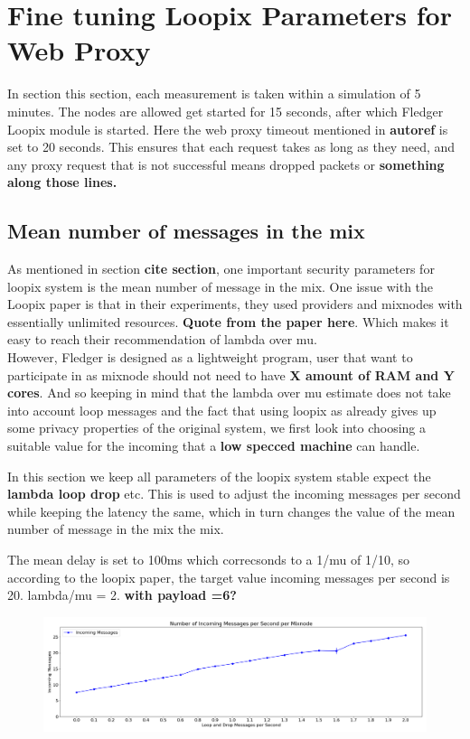 \documentclass[a4paper,11pt,oneside]{report}
\begin{document}
\section{Fine tuning Loopix Parameters for Web Proxy}
\label{sec:finetune}
In section this section, each measurement is taken within a simulation of 5 minutes. The nodes are allowed get started for 15 seconds, after which Fledger Loopix module is started. Here the web proxy timeout mentioned in \textbf{autoref} is set to 20 seconds. This ensures that each request takes as long as they need, and any proxy request that is not successful means dropped packets or \textbf{something along those lines.}
\subsection{Mean number of messages in the mix}
As mentioned in section \textbf{cite section}, one important security parameters for loopix system is the mean number of message in the mix. One issue with the Loopix paper is that in their experiments, they used providers and mixnodes with essentially unlimited resources. \textbf{Quote from the paper here}. Which makes it easy to reach their recommendation of lambda over mu. \\
However, Fledger is designed as a lightweight program, user that want to participate in as mixnode should not need to have \textbf{X amount of RAM and Y cores}. And so keeping in mind that the lambda over mu estimate does not take into account loop messages and the fact that using loopix as already gives up some privacy properties of the original system, we first look into choosing a suitable value for the incoming that a \textbf{low specced machine} can handle.

In this section we keep all parameters of the loopix system stable expect the \textbf{lambda loop drop} etc. This is used to adjust the incoming messages per second while keeping the latency the same, which in turn changes the value of the mean number of message in the mix the mix.

The mean delay is set to 100ms which correcsonds to a 1/mu of 1/10, so according to the loopix paper, the target value incoming messages per second is 20. lambda/mu = 2. \textbf{with payload =6?}

\begin{figure}[htbp]
    \centering
    \includegraphics[width=\textwidth]{plots/mu_incoming_messages.png}
    \caption{}
    \label{fig:mu_incoming}
\end{figure}
\end{document}

